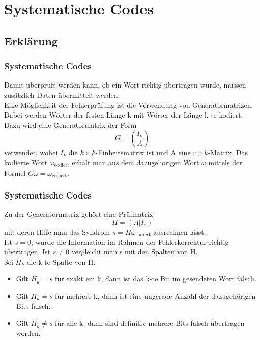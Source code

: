 \section{Systematische Codes}
\subsection{Erklärung}
\begin{frame}
	\frametitle{Systematische Codes}
	Damit überprüft werden kann, ob ein Wort richtig übertragen wurde, müssen zusätzlich Daten übermittelt werden.\\
	Eine Möglichkeit der Fehlerprüfung ist die Verwendung von Generatormatrizen.\\ 
	Dabei werden Wörter der festen Länge k mit Wörter der Länge k+r kodiert. Dazu wird eine Generatormatrix der Form \[G=\left(\frac{I_k}{A}\right)\] verwendet, wobei $I_k$ die $k \times k$-Einheitsmatrix ist und A eine $r \times k$-Matrix. Das kodierte Wort $\omega_{\text{codiert}}$ erhält man aus dem dazugehörigen Wort $\omega$ mittels der Formel $G\omega=\omega_{\text{codiert}}.$\\
\end{frame}
\begin{frame}
	\frametitle{Systematische Codes}
	Zu der Generatormatrix gehört eine Prüfmatrix \[H=\left(A|I_r\right)\] mit deren Hilfe man das Syndrom $s=H\omega_{\text{codiert}}$ ausrechnen lässt.\\ Ist $s=0$, wurde die Information im Rahmen der Fehlerkorrektur richtig übertragen. Ist $s\not = 0$ vergleicht man s mit den Spalten von H.\\ Sei $H_k$ die k-te Spalte von H.
	\begin{itemize}
	\item Gilt $H_k=s$ für exakt ein k, dann ist das k-te Bit im gesendeten Wort falsch.
	\item Gilt $H_k=s$ für mehrere k, dann ist eine ungerade Anzahl der dazugehörigen Bits falsch.
	\item Gilt $H_k\not=s$ für alle k, dann sind definitiv mehrere Bits falsch übertragen worden.
	\end{itemize}
\end{frame}
